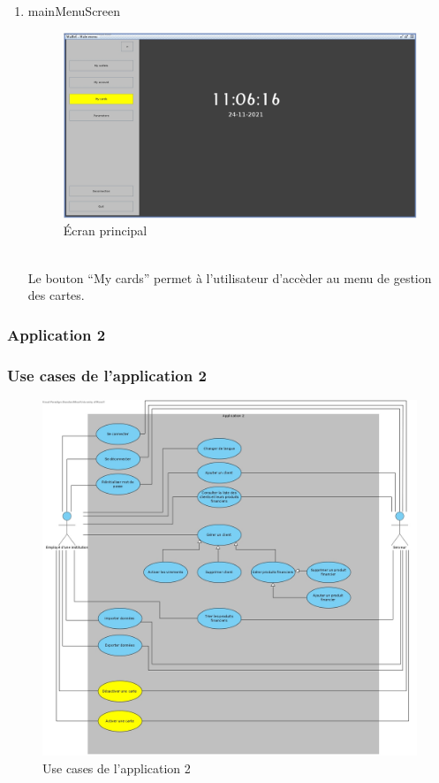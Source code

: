 \documentclass[../rapport.tex]{subfiles}
\begin{document}
\begin{enumerate}
	\item{mainMenuScreen}\\
	\begin{figure}[h!]
		\centering\includegraphics[scale=0.15]{ressources/photos_diagrammes/extensionTheo/gui1/mainMenu.jpg}
		\caption{Écran principal}
	\end{figure}\\

Le bouton ``My cards'' permet à l'utilisateur d'accèder au menu de gestion des cartes.

\end{enumerate}

\subsubsection{Application 2}
\subsubsection{Use cases de l'application 2}
	\begin{figure}[h!]
		\centering\includegraphics[scale=0.15]{ressources/photos_diagrammes/extensionTheo/diagrams2/useCases2.jpg}
		\caption{Use cases de l'application 2}
	\end{figure}\\
\end{document}
